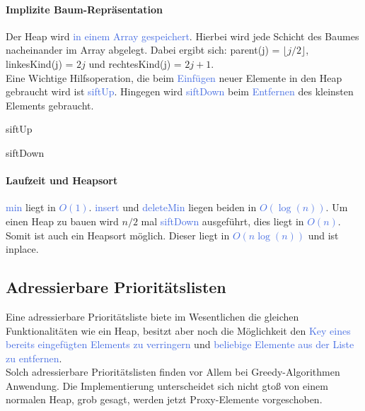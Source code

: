 \documentclass[11pt]{article}
\def \texcol{RoyalBlue}
\begin{document}
\paragraph{Implizite Baum-Repräsentation} Der Heap wird \textcolor{\texcol}{in einem Array gespeichert}. Hierbei wird jede Schicht des Baumes nacheinander im Array abgelegt. Dabei ergibt sich: parent(j) = $\lfloor j/2 \rfloor$, linkesKind(j) = $2j$ und rechtesKind(j) = $2j+1$.\\

Eine Wichtige Hilfsoperation, die beim \textcolor{\texcol}{Einfügen} neuer Elemente in den Heap gebraucht wird ist \textcolor{\texcol}{siftUp}. Hingegen wird \textcolor{\texcol}{siftDown} beim \textcolor{\texcol}{Entfernen} des kleinsten Elements gebraucht.

\begin{algorithm}[H]
\caption{siftUp}
\DontPrintSemicolon
{}
\end{algorithm}

\begin{algorithm}[H]
\caption{siftDown}
\DontPrintSemicolon
{}
\end{algorithm}

\paragraph{Laufzeit und Heapsort} 
\textcolor{\texcol}{min} liegt in \textcolor{\texcol}{$O(1)$}. \textcolor{\texcol}{insert} und \textcolor{\texcol}{deleteMin} liegen beiden in \textcolor{\texcol}{$O(\log(n))$}. Um einen Heap zu bauen wird $n/2$ mal \textcolor{\texcol}{siftDown} ausgeführt, dies liegt in \textcolor{\texcol}{$O(n)$}. Somit ist auch ein Heapsort möglich. Dieser liegt in \textcolor{\texcol}{$O(n\log(n))$} und ist inplace.

\subsection{Adressierbare Prioritätslisten}
Eine adressierbare Prioritätsliste biete im Wesentlichen die gleichen Funktionalitäten wie ein Heap, besitzt aber noch die Möglichkeit den \textcolor{\texcol}{Key eines bereits eingefügten Elements zu verringern} und \textcolor{\texcol}{beliebige Elemente aus der Liste zu entfernen}.\\
Solch adressierbare Prioritätslisten finden vor Allem bei Greedy-Algorithmen Anwendung. Die Implementierung unterscheidet sich nicht gtoß von einem normalen Heap, grob gesagt, werden jetzt Proxy-Elemente vorgeschoben.
\end{document}
